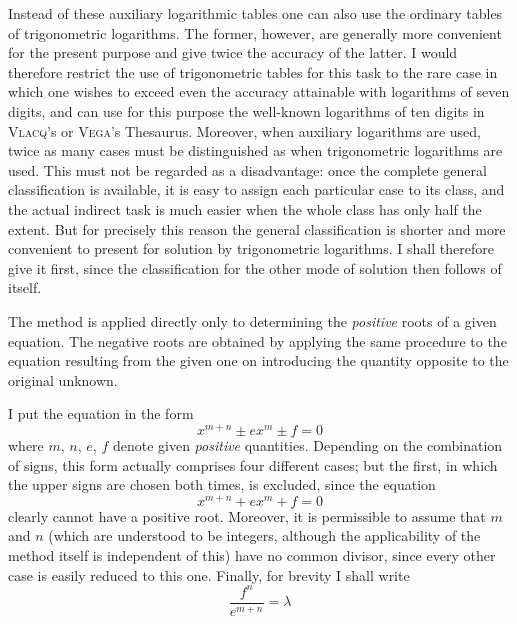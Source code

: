 Instead of these auxiliary logarithmic tables one can also use the ordinary tables of trigonometric logarithms. The former, however, are generally more convenient for the present purpose and give twice the accuracy of the latter. I would therefore restrict the use of trigonometric tables for this task to the rare case in which one wishes to exceed even the accuracy attainable with logarithms of seven digits, and can use for this purpose the well-known logarithms of ten digits in \textsc{Vlacq}'s or \textsc{Vega}'s Thesaurus. Moreover, when auxiliary logarithms are used, twice as many cases must be distinguished as when trigonometric logarithms are used. This must not be regarded as a disadvantage: once the complete general classification is available, it is easy to assign each particular case to its class, and the actual indirect task is much easier when the whole class has only half the extent. But for precisely this reason the general classification is shorter and more convenient to present for solution by trigonometric logarithms. I shall therefore give it first, since the classification for the other mode of solution then follows of itself.

The method is applied directly only to determining the \textit{positive} roots of a given equation. The negative roots are obtained by applying the same procedure to the equation resulting from the given one on introducing the quantity opposite to the original unknown.

I put the equation in the form
\[
x^{m+n}\pm e x^m\pm f=0
\]
where $m$, $n$, $e$, $f$ denote given \textit{positive} quantities. Depending on the combination of signs, this form actually comprises four different cases; but the first, in which the upper signs are chosen both times, is excluded, since the equation
\[
x^{m+n}+e x^m+f=0
\]
clearly cannot have a positive root. Moreover, it is permissible to assume that $m$ and $n$ (which are understood to be integers, although the applicability of the method itself is independent of this) have no common divisor, since every other case is easily reduced to this one. Finally, for brevity I shall write
\[
\frac{f^n}{e^{m+n}}=\lambda
\]

